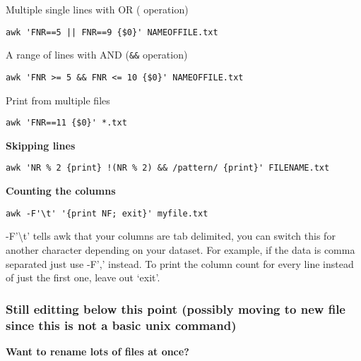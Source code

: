 \documentclass[
  letterpaper,
  DIV=11,
  numbers=noendperiod]{scrreprt}
\begin{document}
Multiple single lines with OR (\texttt{\textbar{}\textbar{}} operation)

\begin{verbatim}
awk 'FNR==5 || FNR==9 {$0}' NAMEOFFILE.txt
\end{verbatim}

A range of lines with AND (\texttt{\&\&} operation)

\begin{verbatim}
awk 'FNR >= 5 && FNR <= 10 {$0}' NAMEOFFILE.txt
\end{verbatim}

Print from multiple files

\begin{verbatim}
awk 'FNR==11 {$0}' *.txt
\end{verbatim}

\textbf{Skipping lines}

\begin{verbatim}
awk 'NR % 2 {print} !(NR % 2) && /pattern/ {print}' FILENAME.txt
\end{verbatim}

\textbf{Counting the columns}

\begin{verbatim}
awk -F'\t' '{print NF; exit}' myfile.txt
\end{verbatim}

-F'\textbackslash t' tells awk that your columns are tab delimited, you
can switch this for another character depending on your dataset. For
example, if the data is comma separated just use -F',' instead. To print
the column count for every line instead of just the first one, leave out
`exit'.

\hypertarget{still-editting-below-this-point-possibly-moving-to-new-file-since-this-is-not-a-basic-unix-command}{%
\subsubsection*{\texorpdfstring{\textbf{Still editting below this point
(possibly moving to new file since this is not a basic unix
command)}}{Still editting below this point (possibly moving to new file since this is not a basic unix command)}}\label{still-editting-below-this-point-possibly-moving-to-new-file-since-this-is-not-a-basic-unix-command}}

\textbf{Want to rename lots of files at once?}
\end{document}
